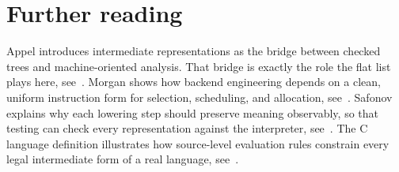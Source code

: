 \section{Further reading}
\label{sec:ch06-further-reading}

Appel introduces intermediate representations as the bridge between checked trees and machine-oriented analysis.
That bridge is exactly the role the flat list plays here, see~\cite{appel-1998-modern}.
Morgan shows how backend engineering depends on a clean, uniform instruction form for selection, scheduling, and allocation, see~\cite{morgan-1998-optimizing}.
Safonov explains why each lowering step should preserve meaning observably, so that testing can check every representation against the interpreter, see~\cite{safonov-2010-trustworthy}.
The C language definition illustrates how source-level evaluation rules constrain every legal intermediate form of a real language, see~\cite{wg14-2011-c11}.
